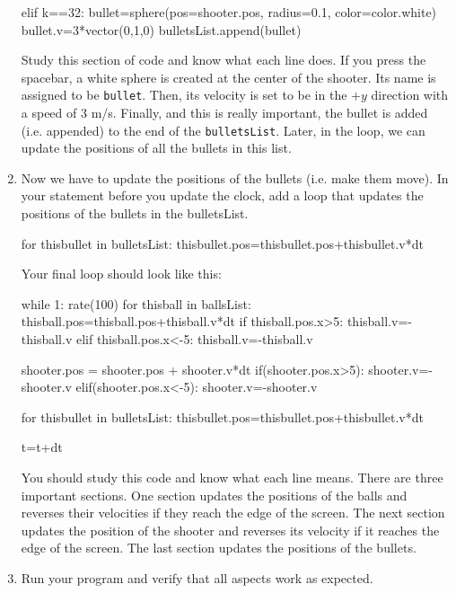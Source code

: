 \begin{enumerate}
\begin{myvpython}
        elif k==32:
            bullet=sphere(pos=shooter.pos, radius=0.1, color=color.white)
            bullet.v=3*vector(0,1,0)
            bulletsList.append(bullet)
\end{myvpython}
            
            Study this section of code and know what each line does. If you press the spacebar, a white sphere is created at the center of the shooter. Its name is assigned to be \texttt{bullet}. Then, its velocity is set to be in the $+y$ direction with a speed of 3 m/s. Finally, and this is really important, the bullet is added (i.e. appended) to the end of the \texttt{bulletsList}. Later, in the  loop, we can update the positions of all the bullets in this list.
            
            \item Now we have to update the positions of the bullets (i.e. make them move). In your  statement before you update the clock, add a  loop that updates the positions of the bullets in the bulletsList.
            
\begin{myvpython}
    for thisbullet in bulletsList:
        thisbullet.pos=thisbullet.pos+thisbullet.v*dt
\end{myvpython}  
    
Your final  loop should look like this:

\begin{myvpython}
while 1:
    rate(100)
    for thisball in ballsList:
        thisball.pos=thisball.pos+thisball.v*dt
        if thisball.pos.x>5:
            thisball.v=-thisball.v
        elif thisball.pos.x<-5:
            thisball.v=-thisball.v

    shooter.pos = shooter.pos + shooter.v*dt
    if(shooter.pos.x>5):
        shooter.v=-shooter.v
    elif(shooter.pos.x<-5):
        shooter.v=-shooter.v

    for thisbullet in bulletsList:
        thisbullet.pos=thisbullet.pos+thisbullet.v*dt

    t=t+dt
\end{myvpython}  

You should study this code and know what each line means. There are three important sections. One section updates the positions of the balls and reverses their velocities if they reach the edge of the screen. The next section updates the position of the shooter and reverses its velocity if it reaches the edge of the screen. The last section updates the positions of the bullets.

\item Run your program and verify that all aspects work as expected.

\end{enumerate}


